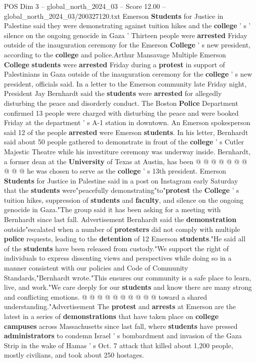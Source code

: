 \begin{textsample}{POS Dim 3 – global\_north\_2024\_03 – Score 12.00 – global\_north\_2024\_03/200327120.txt}  \label{ex:f3_pos_291}
Emerson \textbf{Students} for Justice in Palestine said they were demonstrating against tuition hikes and the \textbf{college} ' s ' silence on the ongoing genocide in Gaza ' Thirteen people were \textbf{arrested} Friday outside of the inauguration ceremony for the Emerson \textbf{College} ' s new president, according to the \textbf{college} and police.Arthur Mansavage Multiple Emerson \textbf{College} \textbf{students} were \textbf{arrested} Friday during a \textbf{protest} in support of Palestinians in Gaza outside of the inauguration ceremony for the \textbf{college} ' s new president, officials said.
In a letter to the Emerson community late Friday night, President Jay Bernhardt said the \textbf{students} were \textbf{arrested} for allegedly disturbing the peace and disorderly conduct.
The Boston \textbf{Police} Department confirmed 13 people were charged with disturbing the peace and were booked Friday at the department ' s A-1 station in downtown.
An Emerson spokesperson said 12 of the people \textbf{arrested} were Emerson \textbf{students}.
In his letter, Bernhardt said about 50 people gathered to demonstrate in front of the \textbf{college} ' s Cutler Majestic Theatre while his investiture ceremony was underway inside.
Bernhardt, a former dean at the \textbf{University} of Texas at Austin, has been @ @ @ @ @ @ @ @ @ @ he was chosen to serve as the \textbf{college} ' s 13th president.
Emerson \textbf{Students} for Justice in Palestine said in a post on Instagram early Saturday that the \textbf{students} were"peacefully demonstrating"to"\textbf{protest} the \textbf{College} ' s tuition hikes, suppression of \textbf{students} and \textbf{faculty}, and silence on the ongoing genocide in Gaza."The group said it has been asking for a meeting with Bernhardt since last fall.
Advertisement Bernhardt said the \textbf{demonstration} outside"escalated when a number of \textbf{protesters} did not comply with multiple \textbf{police} requests, leading to the \textbf{detention} of 12 Emerson \textbf{students}."He said all of the \textbf{students} have been released from custody."We support the right of individuals to express dissenting views and perspectives while doing so in a manner consistent with our policies and Code of Community Standards,"Bernhardt wrote."This ensures our community is a safe place to learn, live, and work."We care deeply for our \textbf{students} and know there are many strong and conflicting emotions. @ @ @ @ @ @ @ @ @ @ toward a shared understanding."Advertisement The \textbf{protest} and \textbf{arrests} at Emerson are the latest in a series of \textbf{demonstrations} that have taken place on \textbf{college} \textbf{campuses} across Massachusetts since last fall, where \textbf{students} have pressed \textbf{administrators} to condemn Israel ' s bombardment and invasion of the Gaza Strip in the wake of Hamas ' s Oct. 7 attack that killed about 1,200 people, mostly civilians, and took about 250 hostages.

\end{textsample}
